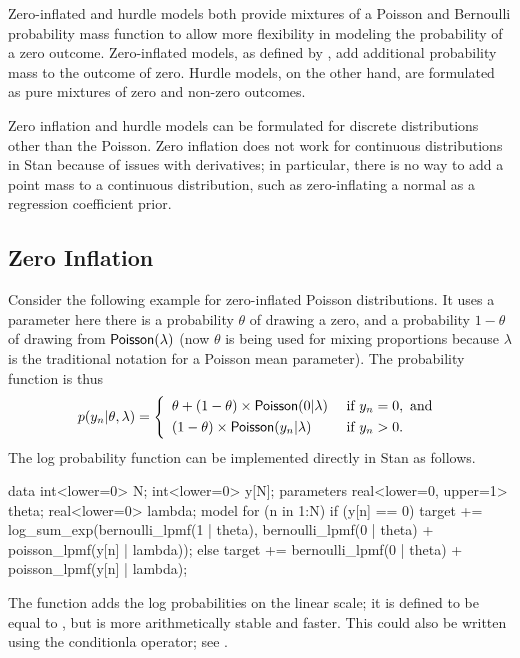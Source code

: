 Zero-inflated and hurdle models both provide mixtures of a Poisson and
Bernoulli probability mass function to allow more flexibility in
modeling the probability of a zero outcome.  Zero-inflated models, as
defined by \citet{Lambert:1992}, add additional probability mass to
the outcome of zero.  Hurdle models, on the other hand, are formulated
as pure mixtures of zero and non-zero outcomes.  

Zero inflation and hurdle models can be formulated for discrete
distributions other than the Poisson.  Zero inflation does not work
for continuous distributions in Stan because of issues with
derivatives; in particular, there is no way to add a point mass to a
continuous distribution, such as zero-inflating a normal as a
regression coefficient prior.


\subsection{Zero Inflation}

Consider the following example for zero-inflated Poisson
distributions.  It uses a parameter  here there is a
probability $\theta$ of drawing a zero, and a probability $1 - \theta$
of drawing from $\distro{Poisson}(\lambda)$ (now $\theta$ is being
used for mixing proportions because $\lambda$ is the traditional
notation for a Poisson mean parameter).  The probability function is
thus
\[
p(y_n|\theta,\lambda) 
= 
\left\{
\begin{array}{ll}
\theta + (1 - \theta) \times \distro{Poisson}(0|\lambda) & \mbox{ if } y_n = 0, \mbox{ and}
\\[3pt]
(1-\theta) \times \distro{Poisson}(y_n|\lambda) & \mbox{ if } y_n > 0.
\end{array}
\right.
\] 
%
The log probability function can be implemented directly in Stan as follows.
%
\begin{stancode}
data {
  int<lower=0> N;
  int<lower=0> y[N];
}
parameters {
  real<lower=0, upper=1> theta;
  real<lower=0> lambda;
}
model {
  for (n in 1:N) {
    if (y[n] == 0)
      target += log_sum_exp(bernoulli_lpmf(1 | theta),
                            bernoulli_lpmf(0 | theta) 
                              + poisson_lpmf(y[n] | lambda));
    else
      target += bernoulli_lpmf(0 | theta)
                  + poisson_lpmf(y[n] | lambda);
  }
}
\end{stancode}
%
The  function adds the log probabilities
on the linear scale; it is defined to be equal to , but is more arithmetically stable and faster.  This
could also be written using the conditionla operator; see
.

